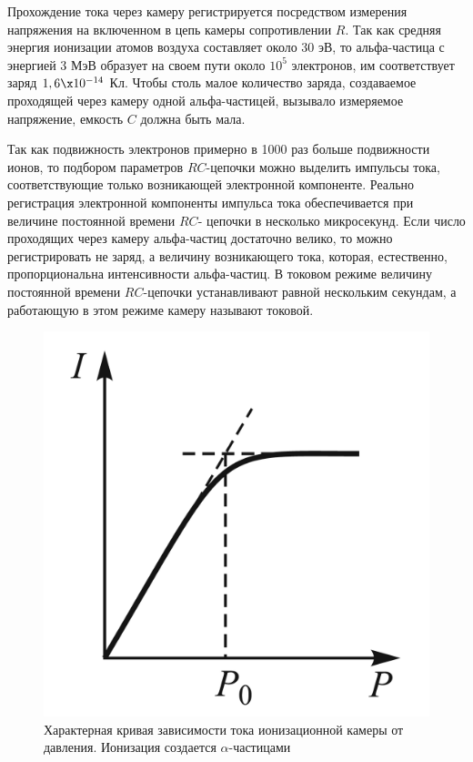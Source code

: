 \documentclass[12pt]{kiarticle} %
\begin{document}
	Прохождение тока через камеру регистрируется посредством измерения напряжения на включенном в цепь камеры сопротивлении $ R $.
	Так как средняя энергия ионизации атомов воздуха составляет около 30 эВ, то альфа-частица с энергией 3 МэВ образует на своем пути около $ 10^5 $ электронов, им соответствует заряд $1,6 \x 10^{-14} $ Кл. Чтобы
	столь малое количество заряда, создаваемое проходящей через камеру одной альфа-частицей, вызывало измеряемое напряжение, емкость $ C $
	должна быть мала.
	
	Так как подвижность электронов примерно в 1000 раз больше подвижности ионов, то подбором параметров $ RC $-цепочки можно выделить импульсы тока, соответствующие только возникающей электронной компоненте. Реально регистрация электронной компоненты
	импульса тока обеспечивается при величине постоянной времени $ RC $-
	цепочки в несколько микросекунд.
	Если число проходящих через камеру альфа-частиц достаточно велико, то можно регистрировать не заряд, а величину возникающего тока, которая, естественно, пропорциональна интенсивности альфа-частиц. В
	токовом режиме величину постоянной времени $ RC $-цепочки устанавливают равной нескольким секундам, а работающую в этом режиме
	камеру называют токовой.
	
	\begin{figure}
		\includegraphics[width=\linewidth]{PotI}
		\caption{Характерная кривая зависимости
			тока ионизационной камеры от давления.
			Ионизация создается $ \alpha $-частицами}
		\label{ris PotI}
	\end{figure}
	
\end{document}

